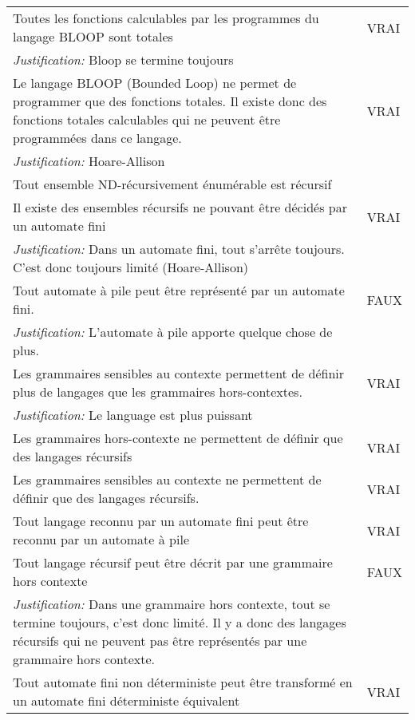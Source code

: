 \begin{longtable}{p{13cm}|l}
    Toutes les fonctions calculables par les programmes du langage BLOOP sont totales & VRAI \\
     \textit{Justification:} Bloop se termine toujours \\
    \hline
    Le langage BLOOP (Bounded Loop) ne permet de programmer que des fonctions totales. Il existe donc des fonctions totales calculables qui ne peuvent être programmées dans ce langage. & VRAI \\
    \textit{Justification:} Hoare-Allison & \\
     \hline
    Tout ensemble ND-récursivement énumérable est récursif&  \\
     \hline
    Il existe des ensembles récursifs ne pouvant être décidés par un automate fini & VRAI \\
    \textit{Justification:} Dans un automate fini, tout s'arrête toujours. C'est donc toujours limité (Hoare-Allison) & \\
     \hline
    Tout automate à pile peut être représenté par un automate fini.& FAUX\\
    \textit{Justification:} L'automate à pile apporte quelque chose de plus. & \\
     \hline
    Les grammaires sensibles au contexte permettent de définir plus de langages que les grammaires hors-contextes.& VRAI\\
      \textit{Justification:} Le language est plus puissant \\
     \hline
    Les grammaires hors-contexte ne permettent de définir que des langages récursifs& VRAI\\
     \hline
    Les grammaires sensibles au contexte ne permettent de définir que des langages récursifs. & VRAI \\
     \hline
    Tout langage reconnu par un automate fini peut être reconnu par un automate à pile & VRAI \\
     \hline
    Tout langage récursif peut être décrit par une grammaire hors contexte & FAUX \\
    \textit{Justification:} Dans une grammaire hors contexte, tout se termine toujours, c’est donc limité. Il y a donc des langages récursifs qui ne peuvent pas être représentés par une grammaire hors contexte. & \\
     \hline
    Tout automate fini non déterministe peut être transformé en un automate fini déterministe équivalent & VRAI \\

\end{longtable}
